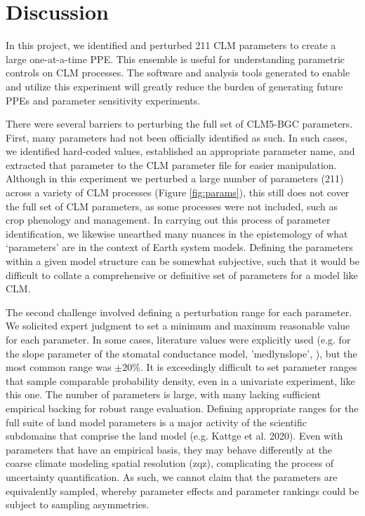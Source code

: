 \documentclass[draft]{agujournal2019}
\begin{document}
\section{Discussion}

In this project, we identified and perturbed 211 CLM parameters to create a large one-at-a-time PPE. This ensemble is useful for understanding parametric controls on CLM processes. The software and analysis tools generated to enable and utilize this experiment will greatly reduce the burden of generating future PPEs and parameter sensitivity experiments.

There were several barriers to perturbing the full set of CLM5-BGC parameters. First, many parameters had not been officially identified as such. In such cases, we identified hard-coded values, established an appropriate parameter name, and extracted that parameter to the CLM parameter file for easier manipulation. Although in this experiment we perturbed a large number of parameters (211) across a variety of CLM processes (Figure \ref{fig:params}), this still does not cover the full set of CLM parameters, as some processes were not included, such as crop phenology and management. In carrying out this process of parameter identification, we  likewise unearthed many nuances in  the epistemology of what  `parameters' are in the context of Earth system models. Defining the parameters within a given model structure can be somewhat subjective, such that it would be difficult to collate a comprehensive or definitive set of parameters for a model like CLM.

The second challenge involved defining a perturbation range for each parameter. We solicited expert judgment to set a minimum and maximum reasonable value for each parameter. In some cases, literature values were explicitly used (e.g. for the slope parameter of the stomatal conductance model, 'medlynslope', ), but the most common range was $\pm20\%$. It is exceedingly difficult to set parameter ranges that sample comparable probability density, even in a univariate experiment, like this one. The number of parameters is large, with many lacking sufficient empirical backing for robust range evaluation. Defining appropriate ranges for the full suite of land model parameters is a major activity of the scientific subdomains that comprise the land model (e.g. Kattge et al. 2020). Even with parameters that have an empirical basis, they may behave differently at the coarse climate modeling spatial resolution (zqz), complicating the process of uncertainty quantification. As such, we cannot claim that the parameters are equivalently sampled, whereby parameter effects and parameter rankings could be subject to sampling asymmetries.
\end{document}
